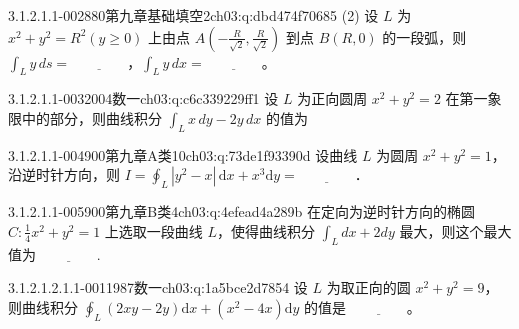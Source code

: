 \begin{q}{3.1.2.1.1-002}{880第九章基础填空2}{ch03:q:dbd474f70685}
(2) 设 $L$ 为 $x^2+y^2=R^2(y\geqslant 0)$ 上由点 $A\left(-\frac{R}{\sqrt{2}},\frac{R}{\sqrt{2}}\right)$ 到点 $B(R,0)$ 的一段弧，则 $\displaystyle \int_L y\,ds=\underline{\hspace{4em}}$，$\displaystyle \int_L y\,dx=\underline{\hspace{4em}}$。
\end{q}

\begin{q}{3.1.2.1.1-003}{2004数一}{ch03:q:c6c339229ff1}
设 $L$ 为正向圆周 $x^2+y^2=2$ 在第一象限中的部分，则曲线积分 $\displaystyle \int_L x\,dy - 2y\,dx$ 的值为 \underline{\hspace{4em}}
\end{q}

\begin{q}{3.1.2.1.1-004}{900第九章A类10}{ch03:q:73de1f93390d}
设曲线 $L$ 为圆周 $x^2 + y^2 = 1$，沿逆时针方向，则 $\displaystyle I = \oint_{L} |y^2 - x| \, \mathrm{d}x + x^3 \mathrm{d}y = \underline{\hspace{4em}}$．
\end{q}

\begin{q}{3.1.2.1.1-005}{900第九章B类4}{ch03:q:4efead4a289b}
在定向为逆时针方向的椭圆 $C:\frac{1}{4}x^2+y^2=1$ 上选取一段曲线 $L$，使得曲线积分 $\displaystyle \int_L dx+2dy$ 最大，则这个最大值为 $\underline{\hspace{4em}}$.
\end{q}

\par\addvspace{2.4ex}\noindent
\begin{minipage}{\linewidth}



\begin{q}{3.1.2.1.2.1.1-001}{1987数一}{ch03:q:1a5bce2d7854}
设 $L$ 为取正向的圆 $x^2+y^2=9$，则曲线积分 $\displaystyle \oint_L (2xy-2y)\mathrm{d}x+(x^2-4x)\mathrm{d}y$ 的值是 $\underline{\hspace{4em}}$。
\end{q}
\end{minipage}


